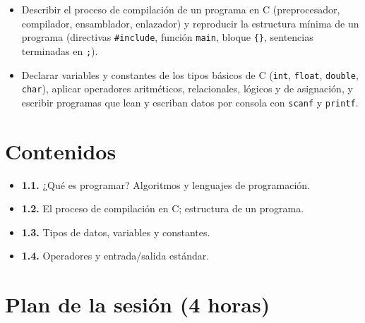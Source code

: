 \documentclass[11pt,letterpaper]{article}
\begin{document}
\begin{itemize}[leftmargin=1.2cm]
  \item[\textbf{RA1.1.}] Describir el proceso de compilación de un programa en C (preprocesador,
        compilador, ensamblador, enlazador) y reproducir la estructura mínima de un programa
        (directivas \texttt{\#include}, función \texttt{main}, bloque \texttt{\{\}}, sentencias
        terminadas en \texttt{;}).
  \item[\textbf{RA1.2.}] Declarar variables y constantes de los tipos básicos de C (\texttt{int},
        \texttt{float}, \texttt{double}, \texttt{char}), aplicar operadores aritméticos,
        relacionales, lógicos y de asignación, y escribir programas que lean y escriban datos por
        consola con \texttt{scanf} y \texttt{printf}.
\end{itemize}

\section{Contenidos}

\begin{itemize}[leftmargin=1.2cm]
  \item \textbf{1.1.} ¿Qué es programar? Algoritmos y lenguajes de programación.
  \item \textbf{1.2.} El proceso de compilación en C; estructura de un programa.
  \item \textbf{1.3.} Tipos de datos, variables y constantes.
  \item \textbf{1.4.} Operadores y entrada/salida estándar.
\end{itemize}

\section{Plan de la sesión (4 horas)}
\end{document}
